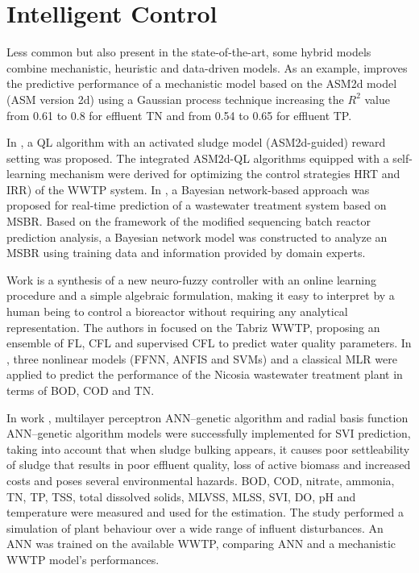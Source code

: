 \section{Intelligent Control}
\label{s:RelatedWorks-Control}

Less common but also present in the state-of-the-art, some hybrid models combine mechanistic, heuristic and data-driven models. As an example, \cite{Hvala2020} improves the predictive performance of a mechanistic model based on the ASM2d model (\ac{ASM} version 2d) using a Gaussian process technique increasing the \begin{math}R^2\end{math} value from 0.61 to 0.8 for effluent \ac{TN} and from 0.54 to 0.65 for effluent \ac{TP}.

In \cite{Pang2019}, a \ac{QL} algorithm with an activated sludge model (\ac{ASM}2d-guided) reward setting was proposed. The integrated \ac{ASM}2d-QL algorithms equipped with a self-learning mechanism were derived for optimizing the control strategies \ac{HRT} and \ac{IRR}) of the \ac{WWTP} system. In \cite{Li2013}, a Bayesian network-based approach was proposed for real-time prediction of a wastewater treatment system based on \ac{MSBR}. Based on the framework of the modified sequencing batch reactor prediction analysis, a Bayesian network model was constructed to analyze an \ac{MSBR} using training data and information provided by domain experts.

Work \cite{Haggege2005} is a synthesis of a new neuro-fuzzy controller with an online learning procedure and a simple algebraic formulation, making it easy to interpret by a human being to control a bioreactor without requiring any analytical representation. The authors in \cite{Nadiri2018} focused on the Tabriz \ac{WWTP}, proposing an ensemble of \ac{FL}, \ac{CFL}  and supervised \ac{CFL} to predict water quality parameters. In \cite{Nourani2018}, three nonlinear models (\ac{FFNN}, \ac{ANFIS} and \ac{SVM}s) and a classical \ac{MLR} were applied to predict the performance of the Nicosia wastewater treatment plant in terms of \ac{BOD}, \ac{COD} and \ac{TN}. 

In work \cite{Bagheri2015}, multilayer perceptron \ac{ANN}–genetic algorithm and radial basis function \ac{ANN}–genetic algorithm models were successfully implemented for \ac{SVI} prediction, taking into account that when sludge bulking appears, it causes poor settleability of sludge that results in poor effluent quality, loss of active biomass and increased costs and poses several environmental hazards. \ac{BOD}, \ac{COD}, nitrate, ammonia, \ac{TN}, \ac{TP}, \ac{TSS}, total dissolved solids, \ac{MLVSS}, \ac{MLSS}, \ac{SVI}, \ac{DO}, pH and temperature were measured and used for the estimation. The study \cite{Raduly2007} performed a simulation of plant behaviour over a wide range of influent disturbances. An \ac{ANN} was trained on the available \ac{WWTP}, comparing \ac{ANN} and a mechanistic \ac{WWTP} model’s performances.

